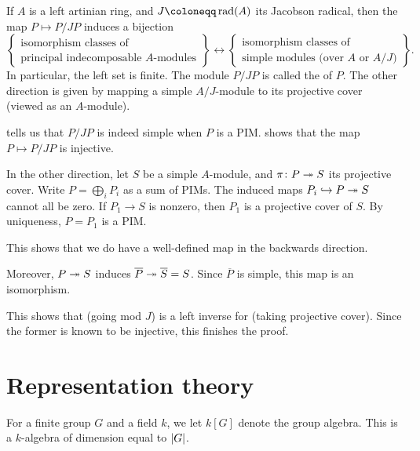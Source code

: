 \documentclass[12pt]{article}
\begin{document}
\begin{thm}
	If $A$ is a left artinian ring, and $J \coloneqq \rad(A)$ its Jacobson radical, then the map $P \mapsto P/JP$ induces a bijection
	\begin{equation*} 
		\left\{
			\begin{array}{c}
				\text{isomorphism classes of}\\
				\text{principal indecomposable $A$-modules}
			\end{array}
		\right\}
		\leftrightarrow
		\left\{
			\begin{array}{c}
				\text{isomorphism classes of}\\
				\text{simple modules (over $A$ or $A/J$)}
			\end{array}
		\right\}.
	\end{equation*}
	In particular, the left set is finite. 
	The module $P/JP$ is called the  of $P$. 
	The other direction is given by mapping a simple $A/J$-module to its projective cover (viewed as an $A$-module).
\end{thm}
\begin{sketch}
	 tells us that $P/JP$ is indeed simple when $P$ is a PIM. 
	 shows that the map $P \mapsto P/JP$ is injective.

	In the other direction, let $S$ be a simple $A$-module, and $\pi \colon P \twoheadrightarrow S$ its projective cover. 
	Write $P = \bigoplus_{i} P_{i}$ as a sum of PIMs. 
	The induced maps $P_{i} \hookrightarrow P \twoheadrightarrow S$ cannot all be zero. 
	If $P_{1} \to S$ is nonzero, then $P_{1}$ is a projective cover of $S$. 
	By uniqueness, $P = P_{1}$ is a PIM.

	This shows that we do have a well-defined map in the backwards direction.

	Moreover, $P \twoheadrightarrow S$ induces $\overline{P} \twoheadrightarrow \overline{S} = S$. 
	Since $\overline{P}$ is simple, this map is an isomorphism. 

	This shows that (going mod $J$) is a left inverse for (taking projective cover). 
	Since the former is known to be injective, this finishes the proof.
\end{sketch}

\section{Representation theory}

For a finite group $G$ and a field $k$, we let $k[G]$ denote the group algebra. 
This is a $k$-algebra of dimension equal to ${\left\lvert G \right\lvert}$. 
\end{document}
